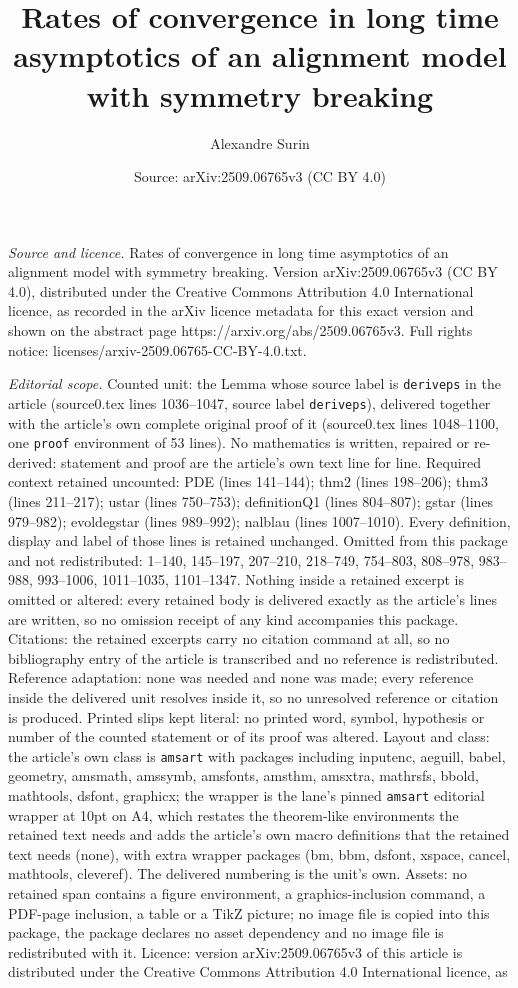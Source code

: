 \documentclass[10pt,a4paper]{amsart}
\title[Rates of convergence in long time asymptotics of an alignmen]{Rates of convergence in long time asymptotics of an alignment model with symmetry breaking}
\author{Alexandre Surin}
\date{Source: arXiv:2509.06765v3 (CC BY 4.0)}
\begin{document}
\maketitle

\noindent\emph{Source and licence.} Rates of convergence in long time asymptotics of an alignment model with symmetry breaking. Version arXiv:2509.06765v3 (CC BY 4.0), distributed under the Creative Commons Attribution 4.0 International licence, as recorded in the arXiv licence metadata for this exact version and shown on the abstract page https://arxiv.org/abs/2509.06765v3. Full rights notice: licenses/arxiv-2509.06765-CC-BY-4.0.txt.\par\smallskip

\noindent\textit{Editorial scope.} Counted unit: the Lemma whose source label is \texttt{deriveps} in the article (source0.tex lines 1036--1047, source label \texttt{deriveps}), delivered together with the article's own complete original proof of it (source0.tex lines 1048--1100, one \texttt{proof} environment of 53 lines). No mathematics is written, repaired or re-derived: statement and proof are the article's own text line for line. Required context retained uncounted: PDE (lines 141--144); thm2 (lines 198--206); thm3 (lines 211--217); ustar (lines 750--753); definitionQ1 (lines 804--807); gstar (lines 979--982); evoldegstar (lines 989--992); nalblau (lines 1007--1010). Every definition, display and label of those lines is retained unchanged. Omitted from this package and not redistributed: 1--140, 145--197, 207--210, 218--749, 754--803, 808--978, 983--988, 993--1006, 1011--1035, 1101--1347. Nothing inside a retained excerpt is omitted or altered: every retained body is delivered exactly as the article's lines are written, so no omission receipt of any kind accompanies this package. Citations: the retained excerpts carry no citation command at all, so no bibliography entry of the article is transcribed and no reference is redistributed. Reference adaptation: none was needed and none was made; every reference inside the delivered unit resolves inside it, so no unresolved reference or citation is produced. Printed slips kept literal: no printed word, symbol, hypothesis or number of the counted statement or of its proof was altered. Layout and class: the article's own class is \texttt{amsart} with packages including inputenc, aeguill, babel, geometry, amsmath, amssymb, amsfonts, amsthm, amsxtra, mathrsfs, bbold, mathtools, dsfont, graphicx; the wrapper is the lane's pinned \texttt{amsart} editorial wrapper at 10pt on A4, which restates the theorem-like environments the retained text needs and adds the article's own macro definitions that the retained text needs (none), with extra wrapper packages (bm, bbm, dsfont, xspace, cancel, mathtools, cleveref). The delivered numbering is the unit's own. Assets: no retained span contains a figure environment, a graphics-inclusion command, a PDF-page inclusion, a table or a TikZ picture; no image file is copied into this package, the package declares no asset dependency and no image file is redistributed with it. Licence: version arXiv:2509.06765v3 of this article is distributed under the Creative Commons Attribution 4.0 International licence, as 
\end{document}
